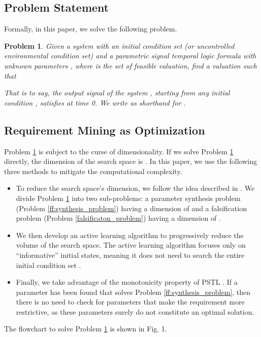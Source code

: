 \documentclass[10pt]{article}
\theoremstyle{plain}
\newtheorem{problem}{Problem}
\begin{document}
\subsection{Problem Statement}
\label{sec:problem}

Formally, in this paper, we solve the following problem.
\begin{problem}
\label{original_problem}
Given a system  with an initial condition set (or uncontrolled environmental condition set)  and a parametric signal temporal logic formula  with unknown parameters , where  is the set of feasible valuation,  find a valuation  such that 

That is to say, the output signal  of the system , starting from any initial condition , satisfies  at time 0. We write  as shorthand for .
\end{problem}



\subsection{Requirement Mining as Optimization}

Problem \ref{original_problem} is subject to the curse of dimensionality. If we solve Problem \ref{original_problem} directly, the dimension of the search space is . In this paper, we use the following three methods to mitigate the computational complexity.
\begin{itemize}
\item To reduce the search space's dimension, we follow the idea described in \cite{jin2013mining}. We divide Problem \ref{original_problem} into two sub-problems: a parameter synthesis problem (Problem \ref{ff:synthesis_problem}) having a dimension of  and a falsification problem (Problem \ref{falsificaton_problem}) having a dimension of .
\item We then develop an active learning algorithm to progressively reduce the volume of the search space. The active learning algorithm focuses only on ``informative'' initial states, meaning it does not need to search the entire initial condition set .
\item Finally, we take advantage of the monotonicity property of PSTL \cite{jin2013mining,kong2016TAC,kong2014temporal}. If a parameter has been found that solves Problem \ref{ff:synthesis_problem}, then there is no need to check for parameters that make the requirement more restrictive, as these parameters surely do not constitute an optimal solution.
\end{itemize}
The flowchart to solve Problem \ref{original_problem} is shown in Fig. 1.
\end{document}
